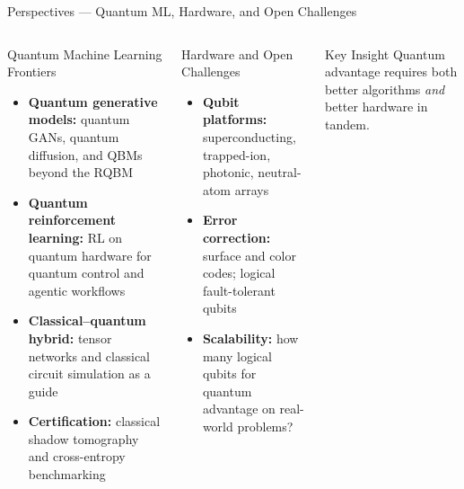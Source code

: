 \documentclass[aspectratio=169,10pt]{beamer}
\begin{document}
\begin{frame}{Perspectives --- Quantum ML, Hardware, and Open Challenges}
  \begin{columns}[T]
      \begin{block}{Quantum Machine Learning Frontiers}
        \begin{itemize}\footnotesize\itemsep1pt
          \item \textbf{Quantum generative models:}
                quantum GANs, quantum diffusion,
                and QBMs beyond the RQBM
          \item \textbf{Quantum reinforcement learning:}
                RL on quantum hardware for
                quantum control and agentic workflows
          \item \textbf{Classical--quantum hybrid:}
                tensor networks and classical
                circuit simulation as a guide
          \item \textbf{Certification:}
                classical shadow tomography
                and cross-entropy benchmarking
        \end{itemize}
      \end{block}
      \begin{block}{Hardware and Open Challenges}
        \begin{itemize}\footnotesize\itemsep1pt
          \item \textbf{Qubit platforms:}
                superconducting, trapped-ion,
                photonic, neutral-atom arrays
          \item \textbf{Error correction:}
                surface and color codes;
                logical fault-tolerant qubits
          \item \textbf{Scalability:}
                how many logical qubits for
                quantum advantage on
                real-world problems?
        \end{itemize}
      \end{block}
      \begin{alertblock}{Key Insight}
        {\small Quantum advantage requires both
        better algorithms \emph{and}
        better hardware in tandem.}
      \end{alertblock}
  \end{columns}
\end{frame}
\end{document}
